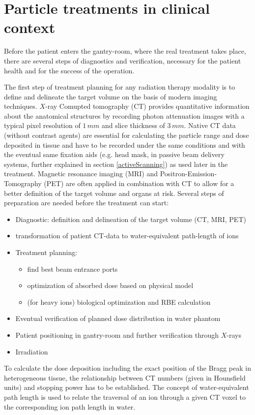 \documentclass[12pt, a4paper, twoside]{book}
\begin{document}
\section{Particle treatments in clinical context}
Before the patient enters the gantry-room, where the real treatment takes place, there are several steps of diagnostics and verification, necessary for the patient health and for the success of the operation.

The first step of treatment planning for any radiation therapy modality is to define and delineate the target volume on the basis of modern imaging techniques. $X$-ray Comupted tomography (CT) provides quantitative information about the anatomical structures by recording photon attenuation images with a typical pixel resolution of $1\,mm$ and slice thickness of $3\,mm$. Native CT data (without contrast agents) are essential for calculating the particle range and dose deposited in tissue and have to be recorded under the same conditions and with the eventual same fixation aids (e.g. head mask, in passive beam delivery systems, further explained in section \ref{activeScanning}) as used later in the treatment. Magnetic resonance imaging (MRI) and Positron-Emission-Tomography (PET) are often applied in combination with CT to allow for a better definition of the target volume and organs at risk.
Several steps of preparation are needed before the treatment can start:
\begin{itemize}
\item Diagnostic: definition and delineation of the target volume (CT, MRI, PET)
\item transformation of patient CT-data to water-equivalent path-length of ions
\item Treatment planning:
	\begin{itemize}
	\item find best beam entrance ports
	\item optimization of absorbed dose based on physical model
	\item (for heavy ions) biological optimization and RBE calculation
	\end{itemize}
\item Eventual verification of planned dose distribution in water phantom
\item Patient positioning in gantry-room and further verification through $X$-rays
\item Irradiation
\end{itemize}
To calculate the dose deposition including the exact position of the Bragg peak in heterogeneous tissue, the relationship between CT numbers (given in Hounsfield units) and stopping power has to be established. The concept of water-equivalent path length is used to relate the traversal of an ion through a given CT voxel to the corresponding ion path length in water.
\end{document}
